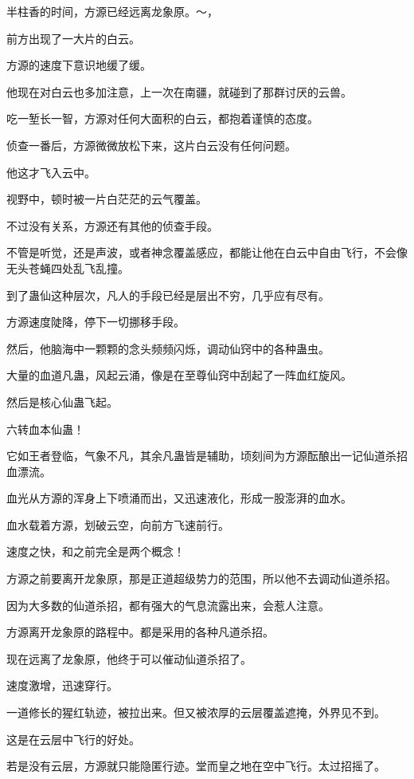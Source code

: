 
\begin{this_body}

半柱香的时间，方源已经远离龙象原。～，

前方出现了一大片的白云。

方源的速度下意识地缓了缓。

他现在对白云也多加注意，上一次在南疆，就碰到了那群讨厌的云兽。

吃一堑长一智，方源对任何大面积的白云，都抱着谨慎的态度。

侦查一番后，方源微微放松下来，这片白云没有任何问题。

他这才飞入云中。

视野中，顿时被一片白茫茫的云气覆盖。

不过没有关系，方源还有其他的侦查手段。

不管是听觉，还是声波，或者神念覆盖感应，都能让他在白云中自由飞行，不会像无头苍蝇四处乱飞乱撞。

到了蛊仙这种层次，凡人的手段已经是层出不穷，几乎应有尽有。

方源速度陡降，停下一切挪移手段。

然后，他脑海中一颗颗的念头频频闪烁，调动仙窍中的各种蛊虫。

大量的血道凡蛊，风起云涌，像是在至尊仙窍中刮起了一阵血红旋风。

然后是核心仙蛊飞起。

六转血本仙蛊！

它如王者登临，气象不凡，其余凡蛊皆是辅助，顷刻间为方源酝酿出一记仙道杀招血漂流。

血光从方源的浑身上下喷涌而出，又迅速液化，形成一股澎湃的血水。

血水载着方源，划破云空，向前方飞速前行。

速度之快，和之前完全是两个概念！

方源之前要离开龙象原，那是正道超级势力的范围，所以他不去调动仙道杀招。

因为大多数的仙道杀招，都有强大的气息流露出来，会惹人注意。

方源离开龙象原的路程中。都是采用的各种凡道杀招。

现在远离了龙象原，他终于可以催动仙道杀招了。

速度激增，迅速穿行。

一道修长的猩红轨迹，被拉出来。但又被浓厚的云层覆盖遮掩，外界见不到。

这是在云层中飞行的好处。

若是没有云层，方源就只能隐匿行迹。堂而皇之地在空中飞行。太过招摇了。


\end{this_body}
